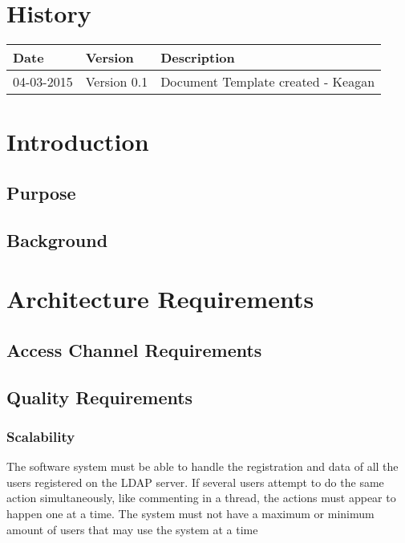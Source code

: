 \documentclass[12pt]{article}
\begin{document}


\section{History}
\begin{tabular}{|l|l|l|}
\hline
Date & Version & Description\\
\hline
04-03-2015 & Version 0.1 & Document Template created - Keagan


\end{tabular}

\newpage
\tableofcontents
\newpage
\listoffigures
\newpage

\section{Introduction}

\subsection{Purpose}

\subsection{Background}

\section{Architecture Requirements}
\subsection{Access Channel Requirements}
\subsection{Quality Requirements}
\subsubsection{Scalability}
The software system must be able to handle the registration and data of all the users registered on the LDAP server. 
If several users attempt to do the same action simultaneously, like commenting in a thread, the actions must appear to happen one at a time. 
The system must not have a maximum or minimum amount of users that may use the system at a time
\end{document}
